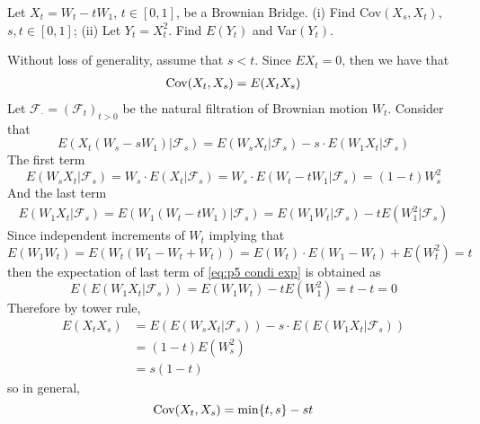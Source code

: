     \problem
    \begin{question}
        Let $X_t=W_t-tW_1$, $t\in[0,1]$, be a Brownian Bridge.
        (i)  Find Cov$(X_s,X_t)$, $s,t\in[0,1]$;
        (ii)  Let $Y_t=X^2_t$.  Find $E(Y_t)$ and Var$(Y_t)$.
    \end{question}
    \begin{subproblem}
        \item
        Without loss of generality, assume that $s<t$.
        Since $EX_t=0$, then we have that
        \[\begin{aligned}
            \mathrm{Cov}(X_t,X_s)&=E(X_tX_s)\\
        \end{aligned}\]
        Let $\mathcal F_\cdot=(\mathcal F_t)_{t>0}$ be
        the natural filtration of Brownian motion
        $W_t$. Consider that
        \begin{equation}
            \label{eq:p5 condi exp}
            E(X_t(W_s-sW_1)|\mathcal F_s)
            =E(W_sX_t|\mathcal F_s)
            -s\cdot E(W_1X_t|\mathcal F_s)
        \end{equation}
        The first term
        \[E(W_sX_t|\mathcal F_s)=W_s\cdot E(X_t|\mathcal F_s)
        =W_s\cdot E(W_t-tW_1|\mathcal F_s)=(1-t)W_s^2\]
        And the last term
        \begin{equation*}
            \begin{aligned}
                E(W_1X_t|\mathcal F_s)
                =E(W_1(W_t-tW_1)|\mathcal F_s)
                =E(W_1W_t|\mathcal F_s)-tE(W_1^2|\mathcal F_s)
            \end{aligned}
        \end{equation*}
        Since independent increments of $W_t$ implying that
        \[E(W_1W_t)=E(W_t(W_1-W_t+W_t))=E(W_t)\cdot E(W_1-W_t)+E(W_t^2)=t\]
        then the expectation of last term of \cref{eq:p5 condi exp}
        is obtained as
        \[E(E(W_1X_t|\mathcal F_s))=E(W_1W_t)-tE(W_1^2)=t-t=0\]
        Therefore by tower rule,
        \[\begin{aligned}
            E(X_tX_s)&=E(E(W_sX_t|\mathcal F_s))-s\cdot E(E(W_1X_t|\mathcal F_s))\\
            &=(1-t)E(W_s^2)\\
            &=s(1-t)
        \end{aligned}\]
        so in general,
        \begin{equation}
            \label{eq:p5 cov}
            \mathrm{Cov}(X_t,X_s)=\min\{t,s\}-st
        \end{equation}


\end{subproblem}
